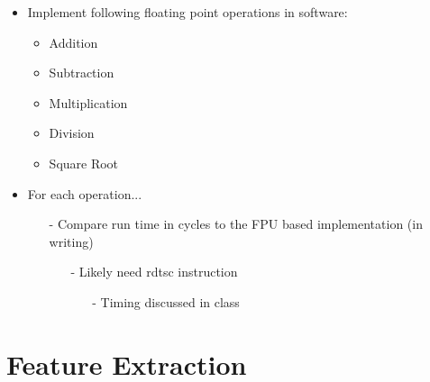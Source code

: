 \documentclass[letterpaper,10pt,onecolumn]{IEEEtran}
\begin{document}
\noindent

\begin{itemize}
	\item Implement following floating point operations in software:
		\begin{itemize}
			\item Addition
			\item Subtraction
			\item Multiplication
			\item Division
			\item Square Root
		\end{itemize}
	\item For each operation...
		\begin{itemize}
			\item[-] Compare run time in cycles to the FPU based implementation (in writing)
			\begin{itemize}
				\item[-] Likely need rdtsc instruction
				\begin{itemize}
					\item[-] Timing discussed in class
				\end{itemize} 
			\end{itemize} 
		\end{itemize} 
\end{itemize}

\section{\textbf{Feature Extraction}}

\noindent
\end{document}
